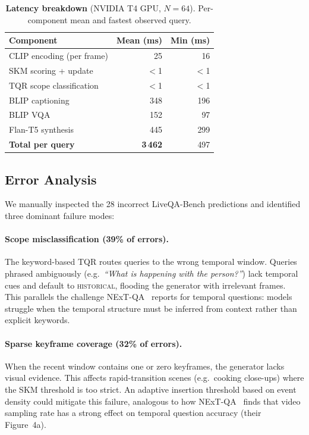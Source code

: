 \begin{table}[t]
  \caption{\textbf{Latency breakdown} (NVIDIA T4 GPU, $N\!=\!64$). Per-component mean and fastest observed query.}
  \label{tab:latency}
  \centering
  \small
  \begin{tabular}{@{}lrr@{}}
    \toprule
    Component & Mean (ms) & Min (ms) \\
    \midrule
    CLIP encoding (per frame)       & 25 & 16 \\
    SKM scoring + update            & $<$1 & $<$1 \\
    TQR scope classification        & $<$1 & $<$1 \\
    BLIP captioning                 & 348 & 196 \\
    BLIP VQA                        & 152 & 97 \\
    Flan-T5 synthesis               & 445 & 299 \\
    \midrule
    \textbf{Total per query}        & \textbf{3\,462} & 497 \\
    \bottomrule
  \end{tabular}
\end{table}


\subsection{Error Analysis}
\label{sec:error_analysis}

We manually inspected the 28 incorrect LiveQA-Bench predictions and identified three dominant failure modes:

\paragraph{Scope misclassification (39\% of errors).}
The keyword-based TQR routes queries to the wrong temporal window.
Queries phrased ambiguously (e.g.\ \emph{``What is happening with the person?''}) lack temporal cues and default to \textsc{historical}, flooding the generator with irrelevant frames.
This parallels the challenge NExT-QA~\cite{xiao2021nextqa} reports for temporal questions: models struggle when the temporal structure must be inferred from context rather than explicit keywords.

\paragraph{Sparse keyframe coverage (32\% of errors).}
When the recent window contains one or zero keyframes, the generator lacks visual evidence. This affects rapid-transition scenes (e.g.\ cooking close-ups) where the SKM threshold is too strict.
An adaptive insertion threshold based on event density could mitigate this failure, analogous to how NExT-QA~\cite{xiao2021nextqa} finds that video sampling rate has a strong effect on temporal question accuracy (\cf their Figure~4a).

